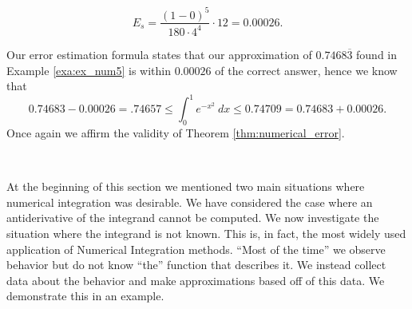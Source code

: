 \begin{solution}
{$$E_s = \frac{(1-0)^5}{180\cdot 4^4}\cdot 12 = 0.00026.$$


Our error estimation formula states that our approximation of $0.7468\overline{3}$ found in Example \ref{exa:ex_num5} is within $ 0.00026 $ of the correct answer, hence we know that
$$0.74683-0.00026 = .74657 \leq \int_0^1e^{-x^2}\ dx \leq 0.74709 = 0.74683 + 0.00026.$$ Once again we affirm the validity of Theorem \ref{thm:numerical_error}.
}\\

\end{solution}




At the beginning of this section we mentioned two main situations where numerical integration was desirable. We have considered the case where an antiderivative of the integrand cannot be computed. We now investigate the situation where the integrand is not known. This is, in fact, the most widely used application of Numerical Integration methods. ``Most of the time'' we observe behavior but do not know ``the'' function that describes it. We instead collect data about the behavior and make approximations based off of this data. We demonstrate this in an example.\\



